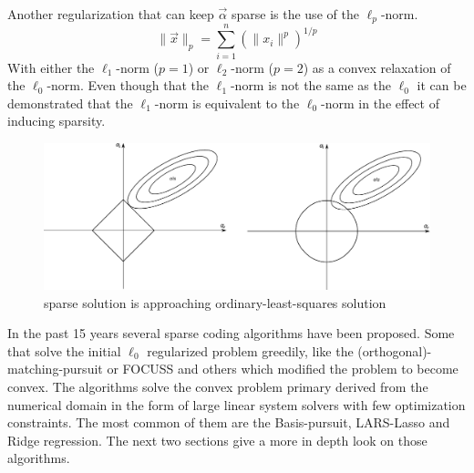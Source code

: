 Another regularization that can keep $\vec{\alpha}$ sparse is the use of the
$\ell_p$-norm.
\begin{equation*}
\lVert \vec{x}\rVert_p = \sum_{i=1}^n\left(\lVert x_i \lVert^p\right)^{1/p}
\end{equation*}
With either the $\ell_1$-norm ($p=1$) or $\ell_2$-norm ($p=2$) as a
convex relaxation of the $\ell_0$-norm. Even though that the $\ell_1$-norm is
not the same as the $\ell_0$ it can be demonstrated that the $\ell_1$-norm is
equivalent to the $\ell_0$-norm in the effect of inducing sparsity.
\begin{figure}[h]
\centering
\includegraphics[width = 1.0\textwidth]{images/regularization.pdf}
\caption{sparse solution is approaching ordinary-least-squares solution}
\label{fig:sparse}
\end{figure}

In the past 15 years several sparse coding algorithms have been proposed. Some
that solve the initial $\ell_0$ regularized problem greedily, like
the (orthogonal)-matching-pursuit or FOCUSS and others which modified the
problem to become convex. The algorithms solve the convex problem  primary
derived from the numerical domain in the form of large linear system solvers
with few optimization constraints. The most common of them are the
Basis-pursuit, LARS-Lasso and Ridge regression. The next two sections give a
more in depth look on those algorithms. 




